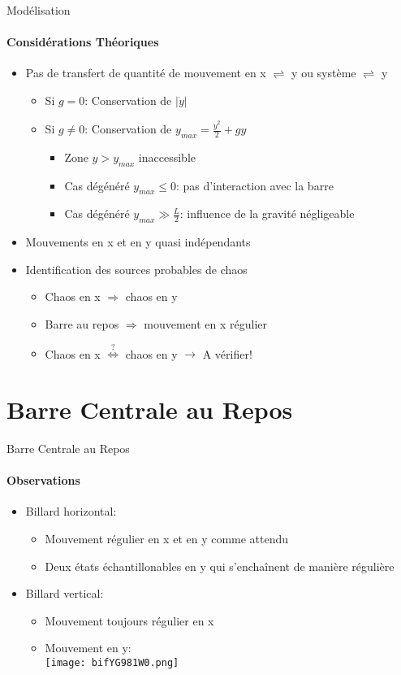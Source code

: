 \documentclass[draft]{beamer}
\begin{document}
  \begin{frame}{Modélisation}
  \framesubtitle{Considérations Théoriques}
  \begin{itemize}
    \item Pas de transfert de quantité de mouvement en x \(\rightleftharpoons\) y ou système \(\rightleftharpoons\) y
     \begin{itemize}
       \item Si \(g=0\): Conservation de \(\lvert \dot{y} \rvert\)
       \item Si \(g\neq0\): Conservation de \(y_{max}=\frac{\dot{y}^2}{2}+gy\)
       \begin{itemize}
         \item Zone \(y>y_{max}\) inaccessible
         \pause \item Cas dégénéré \(y_{max} \leq 0\): pas d'interaction avec la barre
         \item Cas dégénéré \(y_{max} \gg \frac{L}{2}\): influence de la gravité négligeable
       \end{itemize}
     \end{itemize}
    \pause \item Mouvements en x et en y quasi indépendants
    \item Identification des sources probables de chaos
    \begin{itemize}
      \pause \item Chaos en x \(\Rightarrow\) chaos en y
      \item Barre au repos \(\Rightarrow\) mouvement en x régulier
      \pause \item Chaos en x \(\overset{?}{\Leftrightarrow}\) chaos en y \(\rightarrow\) A vérifier!
    \end{itemize}
  \end{itemize}
  \end{frame}
  
  \section{Barre Centrale au Repos}
  
  \begin{frame}{Barre Centrale au Repos}
  \framesubtitle{Observations}
  \begin{itemize}
    \item Billard horizontal:
    \begin{itemize}
      \item Mouvement régulier en x et en y comme attendu
      \item Deux états échantillonables en y qui s'enchaînent de manière régulière
    \end{itemize}
    \pause \item Billard vertical:
    \begin{itemize}
      \item Mouvement toujours régulier en x
      \item Mouvement en y:\\
      \pause \texttt{[image: bifYG981W0.png]}
    \end{itemize}
  \end{itemize}
  \end{frame}
  
\end{document}
